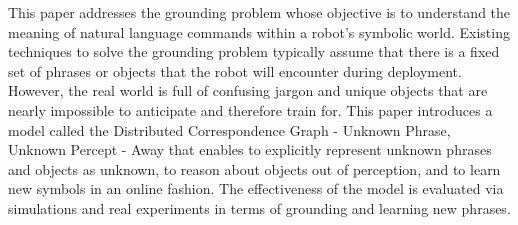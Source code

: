 This paper addresses the grounding problem whose objective is to understand the meaning of natural language commands within a robot's symbolic world. Existing techniques to solve the grounding problem typically assume that there is a fixed set of phrases or objects that the robot will encounter during deployment. However, the real world is full of confusing jargon and unique objects that are nearly impossible to anticipate and therefore train for. This paper introduces a model called the Distributed Correspondence Graph - Unknown Phrase, Unknown Percept - Away that enables to explicitly represent unknown phrases and objects as unknown, to reason about objects out of perception, and to learn new symbols in an online fashion. The effectiveness of the model is evaluated via simulations and real experiments in terms of grounding and learning new phrases.



